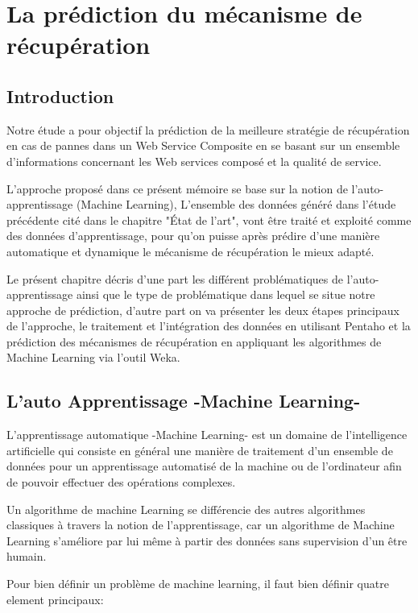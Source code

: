 \chapter{La prédiction du mécanisme de récupération}

\section{Introduction}
Notre étude a pour objectif la prédiction de la meilleure stratégie de récupération en cas de pannes dans un Web Service Composite en se basant sur un ensemble d'informations concernant les Web services composé et la qualité de service.

L'approche proposé dans ce présent mémoire se base sur la notion de l'auto-apprentissage (Machine Learning), L'ensemble des données généré dans l'étude précédente cité dans le chapitre "État de l'art", vont être traité et exploité comme des données d'apprentissage, pour qu'on puisse après prédire d'une manière automatique et dynamique le mécanisme de récupération le mieux adapté.

Le présent chapitre décris d'une part les différent problématiques de l'auto-apprentissage ainsi que le type de problématique dans lequel se situe notre approche de prédiction, d'autre part on va présenter les deux étapes principaux de l'approche, le traitement et l'intégration des données en utilisant Pentaho et la prédiction des mécanismes de récupération en appliquant les algorithmes de Machine Learning via l'outil Weka. 


\section{L'auto Apprentissage -Machine Learning- }

L'apprentissage automatique -Machine Learning- est un domaine de l'intelligence artificielle qui consiste en général une manière de traitement d'un ensemble de données pour un apprentissage automatisé de la machine ou de l'ordinateur afin de pouvoir effectuer des opérations complexes.

Un algorithme de machine Learning se différencie des autres algorithmes classiques à travers la notion de l'apprentissage, car un algorithme de Machine Learning s'améliore par lui même à partir des données sans supervision d'un être humain.

Pour bien définir un problème de machine learning, il faut bien définir quatre element principaux: 

